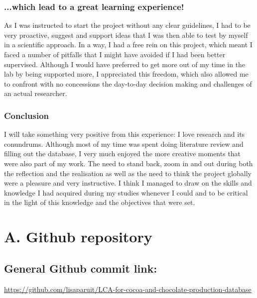 \documentclass{article}
\begin{document}
\subsubsection{...which lead to a great learning experience!}
As I was instructed to start the project without any clear guidelines, I had to
be very proactive, suggest and support ideas that I was then able to test by
myself in a scientific approach. In a way, I had a free rein
on this project, which meant I faced a number of pitfalls that I
might have avoided if I had been better supervised. Although I would have
preferred to get more out of my time in the lab by being supported more, I
appreciated this freedom, which also allowed me to confront with no
concessions the day-to-day decision making and challenges of an actual
researcher.

\subsubsection{Conclusion}
I will take something very positive from this experience: I
love research and its conundrums. Although most of my time was spent
doing literature review and filling out the database, I very much enjoyed the
more creative moments that were also part of my work. The need to stand back,
zoom in and out during both the reflection and the realisation as well as the
need to think the project globally  were a pleasure and very instructive. I think
I managed to draw on the skills and knowledge I had acquired during my studies
whenever I could and to be critical in the light of this knowledge and the
objectives that were set.

\newpage
\appendix

\section{A. Github repository} \label{sec:Access}

\subsection{General Github commit link:}
\url{https://github.com/lisaparuit/LCA-for-cocoa-and-chocolate-production-database}\\\\
\end{document}
